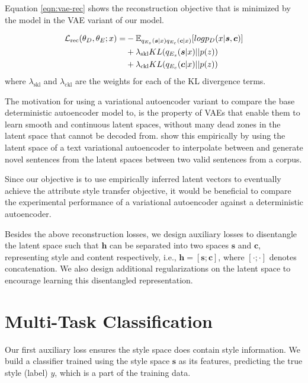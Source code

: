 Equation \ref{eqn:vae-rec} shows the reconstruction objective that is minimized by the model in the VAE variant of our model.

\begin{align} \label{eqn:vae-rec}
	\mathcal{L}_\text{rec}(\theta_D, \theta_E; x) = \nonumber
	 & - \mathbb{E}_{q_{E_s}(\bm s|x) q_{E_c}(\bm c|x)} [log p_D(x|\bm s, \bm c)] \nonumber \\
	 & + \lambda_{\text{skl}} KL(q_{E_s}(\bm s|x)||p(z)) \nonumber                          \\
	 & + \lambda_{\text{ckl}} KL(q_{E_c}(\bm c|x)||p(z))
\end{align}
where $\lambda_{\text{skl}}$ and $\lambda_{\text{ckl}}$ are the weights for each of the KL divergence terms.

The motivation for using a variational autoencoder variant to compare the base deterministic autoencoder model to, is the property of VAEs that enable them to learn smooth and continuous latent spaces, without many dead zones in the latent space that cannot be decoded from. \cite{bowman2016generating} show this empirically by using the latent space of a text variational autoencoder to interpolate between and generate novel sentences from the latent spaces between two valid sentences from a corpus.

Since our objective is to use empirically inferred latent vectors to eventually achieve the attribute style transfer objective, it would be beneficial to compare the experimental performance of a variational autoencoder against a deterministic autoencoder.


Besides the above reconstruction losses, we design auxiliary losses to disentangle the latent space such that $\bm h$ can be separated into two spaces $\bm s$ and $\bm c$, representing style and content respectively, i.e., $\bm h = [\bm s ; \bm c]$, where $[\cdot;\cdot]$ denotes concatenation. We also design additional regularizations on the latent space to encourage learning this disentangled representation.


\section{Multi-Task Classification} \label{sec:multitask-classification-objective}

Our first auxiliary loss ensures the style space does contain style information. We build a classifier trained using the style space $\bm s$ as its features, predicting the true style (label) $y$, which is a part of the training data.


